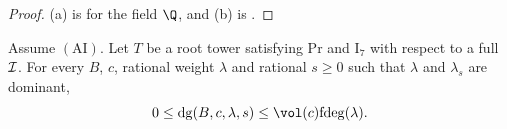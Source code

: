 \begin{proof}
(a) is  for the field $\Q$, and (b) is
.
\end{proof}

\begin{proposition}\label{pf:volthm:prop:degbounds}
Assume $(\mathrm{AI})$. Let $T$ be a root tower satisfying $\mathrm{Pr}$ and $\mathrm{I}_7$
with respect to a full $\mathcal{I}$. For every $B$, $c$, rational weight $\lambda$ and rational $s\ge0$ such that
$\lambda$ and $\lambda_s$ are dominant,
\[
0\le\mathrm{dg}(B,c,\lambda,s)\le\vol(c)\volthmfd(\lambda).
\]
\end{proposition}

